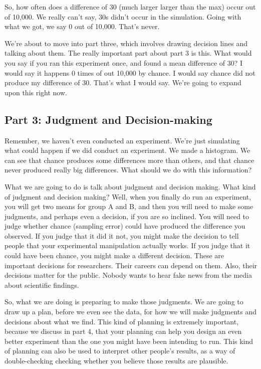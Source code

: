 \documentclass[
  letterpaper,
  DIV=11,
  numbers=noendperiod]{scrreprt}
\begin{document}
So, how often does a difference of 30 (much larger larger than the max)
occur out of 10,000. We really can't say, 30s didn't occur in the
simulation. Going with what we got, we say 0 out of 10,000. That's
never.

We're about to move into part three, which involves drawing decision
lines and talking about them. The really important part about part 3 is
this. What would you say if you ran this experiment once, and found a
mean difference of 30? I would say it happens 0 times of out 10,000 by
chance. I would say chance did not produce my difference of 30. That's
what I would say. We're going to expand upon this right now.

\subsection{Part 3: Judgment and
Decision-making}\label{part-3-judgment-and-decision-making}

Remember, we haven't even conducted an experiment. We're just simulating
what could happen if we did conduct an experiment. We made a histogram.
We can see that chance produces some differences more than others, and
that chance never produced really big differences. What should we do
with this information?

What we are going to do is talk about judgment and decision making. What
kind of judgment and decision making? Well, when you finally do run an
experiment, you will get two means for group A and B, and then you will
need to make some judgments, and perhaps even a decision, if you are so
inclined. You will need to judge whether chance (sampling error) could
have produced the difference you observed. If you judge that it did it
not, you might make the decision to tell people that your experimental
manipulation actually works. If you judge that it could have been
chance, you might make a different decision. These are important
decisions for researchers. Their careers can depend on them. Also, their
decisions matter for the public. Nobody wants to hear fake news from the
media about scientific findings.

So, what we are doing is preparing to make those judgments. We are going
to draw up a plan, before we even see the data, for how we will make
judgments and decisions about what we find. This kind of planning is
extremely important, because we discuss in part 4, that your planning
can help you design an even better experiment than the one you might
have been intending to run. This kind of planning can also be used to
interpret other people's results, as a way of double-checking checking
whether you believe those results are plausible.
\end{document}
